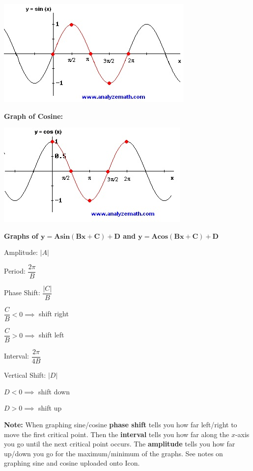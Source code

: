 \documentclass[12pt]{article}
\newenvironment{myindentpar}[1]%
     {\begin{list}{}%
             {\setlength{\leftmargin}{#1}}%
             \item[]%
     }
     {\end{list}}
\begin{document}
\centerline{\includegraphics{SineGraph.jpg}}

\textbf{Graph of Cosine:}

\centerline{\includegraphics{CosineGraph.jpg}}

\newpage

\textbf{Graphs of $\mathbf{y = Asin(Bx + C) + D}$ and $\mathbf{y = Acos(Bx + C) + D}$}
\begin{itemize}
\item Amplitude: $|A|$
\item Period: $\dfrac{2 \pi}{B}$
\item Phase Shift: $\dfrac{|C|}{B}$

\begin{myindentpar}{2cm}
$\dfrac{C}{B} < 0 \implies$ shift right

$\dfrac{C}{B} > 0 \implies$ shift left
\end{myindentpar}

\item Interval: $\dfrac{2 \pi}{4B}$

\item Vertical Shift: $|D|$

\begin{myindentpar}{2cm}
$D < 0 \implies$ shift down

$D > 0 \implies$ shift up
\end{myindentpar}

\end{itemize}

\textbf{Note:} When graphing sine/cosine \textbf{phase shift} tells you how far left/right to move the first critical point. Then the \textbf{interval} tells you how far along the $x$-axis you go until the next critical point occurs. The \textbf{amplitude} tells you how far up/down you go for the maximum/minimum of the graphs. See notes on graphing sine and cosine uploaded onto Icon.
\end{document}
